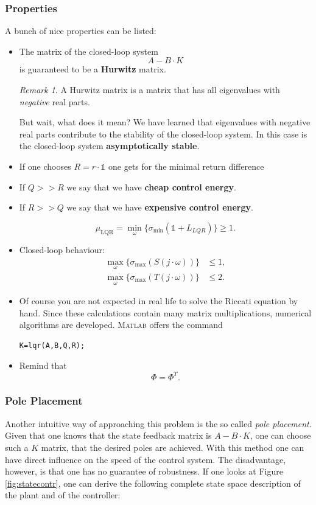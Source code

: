 \documentclass[a4paper,12 pt]{article}
\numberwithin{equation}{section}
\theoremstyle{definition}
\theoremstyle{remark}
\newtheorem*{bmk}{Remark}
\theoremstyle{definition}
\theoremstyle{definition}
\theoremstyle{definition}
\theoremstyle{remark}
\begin{document}
\subsubsection{Properties}
A bunch of nice properties can be listed:
\begin{itemize}
\item The matrix of the closed-loop system 
\begin{equation}
A-B\cdot K
\end{equation}
is guaranteed to be a \textbf{Hurwitz} matrix.
\begin{bmk}
A Hurwitz matrix is a matrix that has all eigenvalues with \textit{negative} real parts.
\end{bmk}
But wait, what does it mean? We have learned that eigenvalues with negative real parts contribute to the stability of the closed-loop system. In this case is the closed-loop system \textbf{asymptotically stable}.
\item If one chooses $R=r\cdot \mathbb{1}$ one gets for the minimal return difference
\item If $Q>> R$ we say that we have \textbf{cheap control energy}.
\item If $R>> Q$ we say that we have \textbf{expensive control energy}.

\begin{equation}
\mu_{\text{LQR}}=\min_\omega\{\sigma_{\text{min}}(\mathbb{1}+L_{LQR})\}\geq 1.
\end{equation}
\item Closed-loop behaviour:
\begin{align}
\max_\omega\{\sigma_{\text{max}}(S(j\cdot\omega))\}&\leq 1, \\
\max_\omega\{\sigma_{\text{max}}(T(j\cdot\omega))\}&\leq 2.
\end{align}

\item Of course you are not expected in real life to solve the Riccati equation by hand. Since these calculations contain many matrix multiplications, numerical algorithms are developed. \textsc{Matlab} offers the command
\begin{verbatim}
K=lqr(A,B,Q,R);
\end{verbatim}
\item Remind that 
\begin{equation}
\Phi=\Phi^T.
\end{equation}
\end{itemize}

\subsubsection{Pole Placement}
Another intuitive way of approaching this problem is the so called \textit{pole placement}. Given that one knows that the state feedback matrix is $A-B\cdot K$, one can choose such a $K$ matrix, that the desired poles are achieved. With this method one can have direct influence on the speed of the control system. The disadvantage, however, is that one has no guarantee of robustness. If one looks at Figure \ref{fig:statecontr}, one can derive the following complete state space description of the plant and of the controller:
\end{document}
